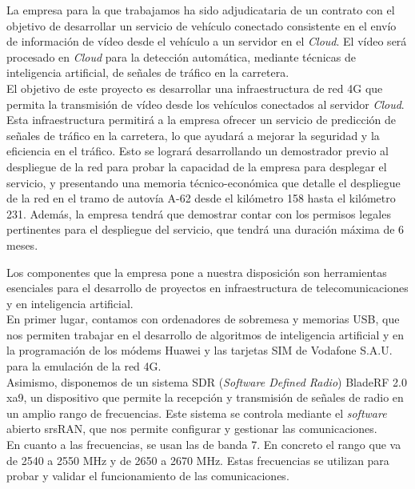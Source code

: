
La empresa para la que trabajamos ha sido adjudicataria de un contrato con el objetivo de desarrollar un servicio de vehículo conectado consistente en el envío de información de vídeo desde el vehículo a un servidor en el \textit{Cloud}. El vídeo será procesado en \textit{Cloud} para la detección automática, mediante técnicas de inteligencia artificial, de señales de tráfico en la carretera.\\

El objetivo de este proyecto es desarrollar una infraestructura de red 4G que permita la transmisión de vídeo desde los vehículos conectados al servidor \textit{Cloud}. Esta infraestructura permitirá a la empresa ofrecer un servicio de predicción de señales de tráfico en la carretera, lo que ayudará a mejorar la seguridad y la eficiencia en el tráfico. Esto se logrará desarrollando un demostrador previo al despliegue de la red para probar la capacidad de la empresa para desplegar el servicio, y presentando una memoria técnico-económica que detalle el despliegue de la red en el tramo de autovía A-62 desde el kilómetro 158 hasta el kilómetro 231. Además, la empresa tendrá que demostrar contar con los permisos legales pertinentes para el despliegue del servicio, que tendrá una duración máxima de 6 meses.

Los componentes que la empresa pone a nuestra disposición son herramientas esenciales para el desarrollo de proyectos en infraestructura de telecomunicaciones y en inteligencia artificial.\\

En primer lugar, contamos con ordenadores de sobremesa y memorias USB, que nos permiten trabajar en el desarrollo de algoritmos de inteligencia artificial y en la programación de los módems Huawei y las tarjetas SIM de Vodafone S.A.U. para la emulación de la red 4G.\\

Asimismo, disponemos de un sistema SDR (\textit{Software Defined Radio}) BladeRF 2.0 xa9, un dispositivo que permite la recepción y transmisión de señales de radio en un amplio rango de frecuencias. Este sistema se controla mediante el \textit{software} abierto srsRAN, que nos permite configurar y gestionar las comunicaciones.\\

En cuanto a las frecuencias, se usan las de banda 7. En concreto el rango que va de 2540 a 2550 MHz y de 2650 a 2670 MHz. Estas frecuencias se utilizan para probar y validar el funcionamiento de las comunicaciones.\\

